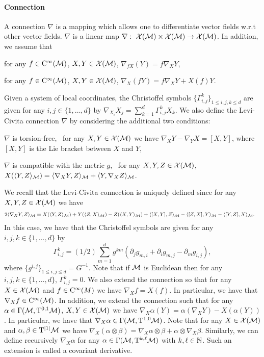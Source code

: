 \paragraph{Connection}
A connection $\nabla$ is a mapping which allows one to differentiate vector
fields w.r.t other vector fields. $\nabla$ is a linear map
$\nabla: \ \mathcal{X}(\mathcal{M}) \times \mathcal{X}(\mathcal{M}) \to \mathcal{X}(\mathcal{M})$. In addition, we assume that
\begin{enumerate*}[label=\roman*)]
\item for any $f \in \mathrm{C}^\infty(\mathcal M)$, $X, Y \in \mathcal{X}(\mathcal{M})$, $\nabla_{f X}(Y) = f \nabla_X Y$, 
\item for any $f \in \mathrm{C}^\infty(\mathcal M)$, $X, Y \in \mathcal{X}(\mathcal{M})$, $\nabla_{X}(fY) = f \nabla_X Y + X(f) Y$.
\end{enumerate*}
Given a system of local coordinates, the Christoffel symbols
$\{\Gamma_{i,j}^k\}_{1 \leq i,j,k\leq d}$ are given for any
$i,j \in \{1, \dots, d\}$ by
$\nabla_{X_i}X_j = \sum_{k=1}^d \Gamma_{i,j}^k X_k$. We
also define the Levi-Civita connection $\nabla$ by considering the additional
two conditions: 
\begin{enumerate*}[label=\roman*)]
\item $\nabla$ is torsion-free, \ie \ for any $X, Y \in \mathcal{X}(\mathcal{M})$ we have
  $\nabla_X Y - \nabla_Y X = [X,Y]$, where $[X,Y]$ is the Lie bracket between
  $X$ and $Y$,
\item $\nabla$ is compatible with the metric $g$, \ie \ for any $X,Y,Z \in \mathcal{X}(\mathcal{M})$,
  $X (\langle Y,Z \rangle_\mathcal M) = \langle\nabla_X Y, Z\rangle_\mathcal M + \langle Y, \nabla_X Z \rangle_\mathcal M$.
\end{enumerate*}
We recall that the Levi-Civita connection is uniquely defined since for any
$X,Y,Z \in \mathcal{X}(\mathcal{M})$ we have
\begin{align}
  2 \langle \nabla_X Y, Z \rangle_\mathcal M &= X(\langle Y, Z \rangle_\mathcal M) + Y(\langle Z, X \rangle_\mathcal M) - Z(\langle X, Y \rangle_\mathcal M) + \langle [X,Y], Z \rangle_\mathcal M - \langle [Z,X], Y \rangle_\mathcal M - \langle [Y,Z], X \rangle_\mathcal M  . 
\end{align}
In this case, we have that the Christoffel symbols are given for any
$i,j,k \in \{1, \dots, d\}$ by
\begin{equation}
  \textstyle{\Gamma_{i,j}^k = (1/2) \sum_{m=1}^d g^{km} (\partial_j g_{m,i} + \partial_i g_{m,j} - \partial_m g_{i,j}) ,}
\end{equation}
where $\{g^{i,j}\}_{1 \leq i,j \leq d} = G^{-1}$. Note that if $\mathcal M$ is Euclidean
then for any $i,j,k \in \{1, \dots, d\}$, $\Gamma_{i,j}^k = 0$. We also extend
the connection so that for any $X \in \mathcal{X}(\mathcal{M})$ and $f \in \mathrm{C}^\infty(M)$ we have
$\nabla_X f = X(f)$. In particular, we have that
$\nabla_X f \in \mathrm{C}^\infty(\mathcal M)$. In addition, we extend the connection such
that for any $\alpha \in \Gamma(\mathcal M, \mathrm{T}^{0,1} \mathcal M)$, $X,Y \in \mathcal{X}(\mathcal{M})$ we have
$\nabla_X \alpha (Y) = \alpha(\nabla_X Y) - X(\alpha(Y))$. In particular, we
have that $\nabla_X \alpha \in \Gamma(\mathcal M, \mathrm{T}^{1,0} \mathcal M)$. Note that for any
$X \in \mathcal{X}(\mathcal{M})$ and $\alpha, \beta \in \mathrm{T}^{\left\vert 1 \right\vert} \mathcal M$ we have
$\nabla_X (\alpha \otimes \beta) = \nabla_X \alpha \otimes \beta + \alpha
\otimes \nabla_X \beta$. Similarly, we can define recursively $\nabla_X \alpha$
for any $\alpha \in \Gamma(\mathcal M, \mathrm{T}^{k,\ell}\mathcal M)$ with $k, \ell \in \mathbb{N}$. Such an
extension is called a covariant derivative.

